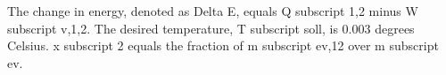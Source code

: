 The change in energy, denoted as Delta E, equals Q subscript 1,2 minus W subscript v,1,2. The desired temperature, T subscript soll, is 0.003 degrees Celsius. x subscript 2 equals the fraction of m subscript ev,12 over m subscript ev.
